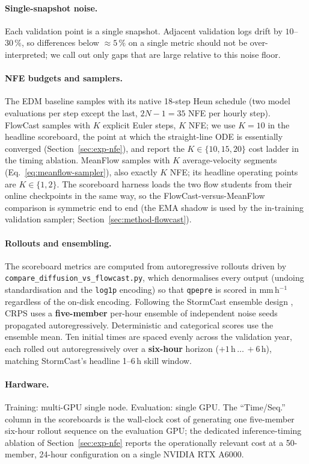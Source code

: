 \paragraph{Single-snapshot noise.} Each validation point is a single snapshot. Adjacent validation logs drift by $10$--$30\,\%$, so differences below $\approx 5\,\%$ on a single metric should not be over-interpreted; we call out only gaps that are large relative to this noise floor.

\paragraph{NFE budgets and samplers.} The EDM baseline samples with its native 18-step Heun schedule (two model evaluations per step except the last, $2N - 1 = 35$ NFE per hourly step). FlowCast samples with $K$ explicit Euler steps, $K$ NFE; we use $K = 10$ in the headline scoreboard, the point at which the straight-line ODE is essentially converged (Section~\ref{sec:exp-nfe}), and report the $K \in \{10, 15, 20\}$ cost ladder in the timing ablation. MeanFlow samples with $K$ average-velocity segments (Eq.~\eqref{eq:meanflow-sampler}), also exactly $K$ NFE; its headline operating points are $K \in \{1, 2\}$. The scoreboard harness loads the two flow students from their online checkpoints in the same way, so the FlowCast-versus-MeanFlow comparison is symmetric end to end (the EMA shadow is used by the in-training validation sampler; Section~\ref{sec:method-flowcast}).

\paragraph{Rollouts and ensembling.} The scoreboard metrics are computed from autoregressive rollouts driven by \texttt{compare\_diffusion\_vs\_flowcast.py}, which denormalises every output (undoing standardisation and the \texttt{log1p} encoding) so that \texttt{qpepre} is scored in mm\,h$^{-1}$ regardless of the on-disk encoding. Following the StormCast ensemble design \citep{pathak2024stormcast}, CRPS uses a \textbf{five-member} per-hour ensemble of independent noise seeds propagated autoregressively. Deterministic and categorical scores use the ensemble mean. Ten initial times are spaced evenly across the validation year, each rolled out autoregressively over a \textbf{six-hour} horizon ($+1\,\text{h}\,\ldots\,+6\,\text{h}$), matching StormCast's headline 1--6\,h skill window.

\paragraph{Hardware.} Training: multi-GPU single node. Evaluation: single GPU. The ``Time/Seq.'' column in the scoreboards is the wall-clock cost of generating one five-member six-hour rollout sequence on the evaluation GPU; the dedicated inference-timing ablation of Section~\ref{sec:exp-nfe} reports the operationally relevant cost at a 50-member, 24-hour configuration on a single NVIDIA RTX A6000.

